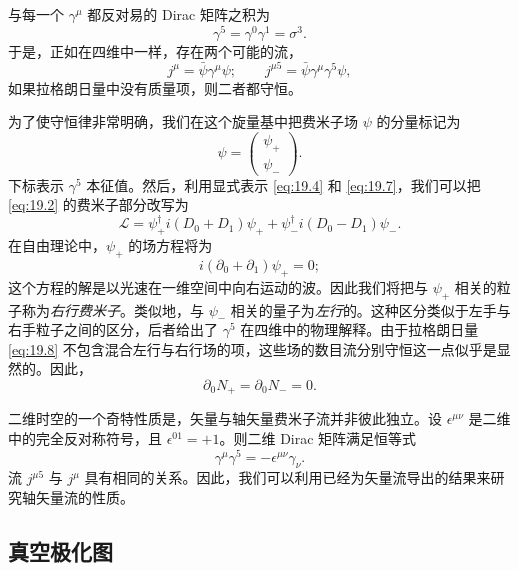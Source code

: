 与每一个 $\gamma^\mu$ 都反对易的 Dirac 矩阵之积为
\begin{equation}
  \gamma^5 = \gamma^0\gamma^1 = \sigma^3 .
  \label{eq:19.5}
\end{equation}
于是，正如在四维中一样，存在两个可能的流，
\begin{equation}
  j^\mu = \bar{\psi}\gamma^\mu\psi;\qquad j^{\mu 5} = \bar{\psi}\gamma^\mu
    \gamma^5\psi ,
  \label{eq:19.6}
\end{equation}
如果拉格朗日量中没有质量项，则二者都守恒。

为了使守恒律非常明确，我们在这个旋量基中把费米子场 $\psi$ 的分量标记为
\begin{equation}
  \psi = \begin{pmatrix}\psi_+\\ \psi_-\end{pmatrix} .
  \label{eq:19.7}
\end{equation}
下标表示 $\gamma^5$ 本征值。然后，利用显式表示 \eqref{eq:19.4} 和 \eqref{eq:19.7}，我们可以把 \eqref{eq:19.2} 的费米子部分改写为
\begin{equation}
  \mathcal{L} = \psi^{\dagger}_+ i(D_0 + D_1)\psi_+
    + \psi^{\dagger}_- i(D_0 - D_1)\psi_- .
  \label{eq:19.8}
\end{equation}
在自由理论中，$\psi_+$ 的场方程将为
\begin{equation}
  i(\partial_0 + \partial_1)\psi_+ = 0 ;
  \label{eq:19.9}
\end{equation}
这个方程的解是以光速在一维空间中向右运动的波。因此我们将把与 $\psi_+$ 相关的粒子称为\emph{右行费米子}。类似地，与 $\psi_-$ 相关的量子为\emph{左行}的。这种区分类似于左手与右手粒子之间的区分，后者给出了 $\gamma^5$ 在四维中的物理解释。由于拉格朗日量 \eqref{eq:19.8} 不包含混合左行与右行场的项，这些场的数目流分别守恒这一点似乎是显然的。因此，
\begin{equation}
  \partial_0 N_+ = \partial_0 N_- = 0 .
  \label{eq:19.10}
\end{equation}

二维时空的一个奇特性质是，矢量与轴矢量费米子流并非彼此独立。设 $\epsilon^{\mu\nu}$ 是二维中的完全反对称符号，且 $\epsilon^{01} = +1$。则二维 Dirac 矩阵满足恒等式
\begin{equation}
  \gamma^\mu\gamma^5 = -\epsilon^{\mu\nu}\gamma_\nu .
  \label{eq:19.11}
\end{equation}
流 $j^{\mu 5}$ 与 $j^\mu$ 具有相同的关系。因此，我们可以利用已经为矢量流导出的结果来研究轴矢量流的性质。

\subsection{真空极化图}

